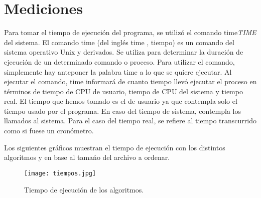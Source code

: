 \documentclass[a4paper,11pt]{article}
\begin{document}










\section{Mediciones}

Para tomar el tiempo de ejecuci\'on del programa, se utiliz\'o el comando time\textit{TIME}\cite{TIME} del sistema. 
	El comando time (del inglés time		, tiempo) es un comando del sistema operativo Unix y derivados. Se utiliza para determinar la duración de ejecución de un determinado comando o proceso. Para utilizar el comando, simplemente hay anteponer la palabra time a lo que se quiere ejecutar. Al ejecutar el comando, time informará de cuanto tiempo llevó ejecutar el proceso en términos de tiempo de CPU de usuario, tiempo de CPU del sistema y tiempo real. El tiempo que hemos tomado es el de usuario ya que contempla solo el tiempo usado por el programa. En caso del tiempo de sistema, contempla los llamados al sistema. Para el caso del tiempo real, se refiere al tiempo transcurrido como si fuese un cronómetro.

Los siguientes gr\'aficos muestran el tiempo de ejecuci\'on con los distintos algoritmos y en base al tama\'no del archivo a ordenar.

\begin{figure}[h]
\centering
\texttt{[image: tiempos.jpg]}
\caption{Tiempo de ejecuci\'on de los algoritmos.}
\end{figure}
\end{document}
